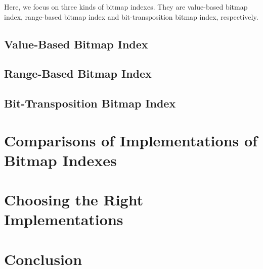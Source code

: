 \documentclass[12pt, a4paper]{article}
\begin{document}
Here, we focus on three kinds of bitmap indexes. They are value-based bitmap index, range-based bitmap index and bit-transposition bitmap index, respectively.

\subsection{Value-Based Bitmap Index}

\subsection{Range-Based Bitmap Index}

\subsection{Bit-Transposition Bitmap Index}\citep{Wong1986}

\section{Comparisons of Implementations of Bitmap Indexes}\label{sec:compare}

\section{Choosing the Right Implementations}\label{sec:choose}

\section{Conclusion}

\citep{name}


\end{document}
